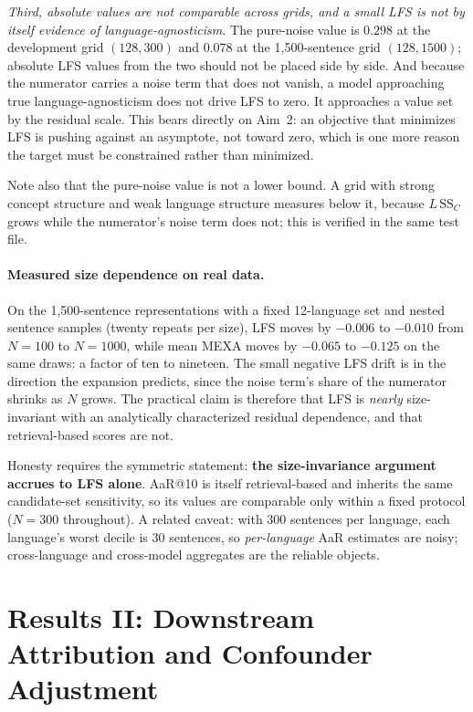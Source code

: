 \documentclass[11pt,a4paper]{article}
\begin{document}
\emph{Third, absolute values are not comparable across grids, and a small
LFS is not by itself evidence of language-agnosticism.} The pure-noise
value is $0.298$ at the development grid $(128, 300)$ and $0.078$ at the
1,500-sentence grid $(128, 1500)$; absolute LFS values from the two should not be
placed side by side. And because the numerator carries a noise term that
does not vanish, a model approaching true language-agnosticism does not
drive LFS to zero. It approaches a value set by the residual scale. This
bears directly on Aim~2: an objective that minimizes LFS is pushing against
an asymptote, not toward zero, which is one more reason the target must be
constrained rather than minimized.

Note also that the pure-noise value is not a lower bound. A grid with
strong concept structure and weak language structure measures below it,
because $L\,\mathrm{SS}_C$ grows while the numerator's noise term does not;
this is verified in the same test file.

\paragraph{Measured size dependence on real data.} On the 1,500-sentence
representations with a fixed 12-language set and nested sentence samples
(twenty repeats per size), LFS moves by $-0.006$ to $-0.010$ from
$N{=}100$ to $N{=}1000$, while mean MEXA moves by $-0.065$ to $-0.125$ on
the same draws: a factor of ten to nineteen. The small negative LFS drift
is in the direction the expansion predicts, since the noise term's share of
the numerator shrinks as $N$ grows. The practical claim is therefore that
LFS is \emph{nearly} size-invariant with an analytically characterized
residual dependence, and that retrieval-based scores are not.

Honesty requires the symmetric statement: \textbf{the size-invariance
argument accrues to LFS alone}. AaR@10 is itself retrieval-based and inherits
the same candidate-set sensitivity, so its values are comparable only within
a fixed protocol ($N{=}300$ throughout). A related caveat: with 300 sentences per language, each language's
worst decile is 30 sentences, so \emph{per-language} AaR estimates are noisy; cross-language and cross-model aggregates are the reliable objects.

\section{Results II: Downstream Attribution and Confounder Adjustment}
\end{document}
